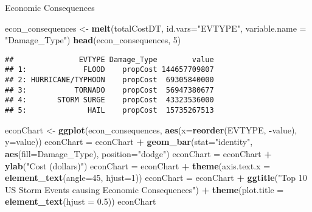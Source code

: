 \documentclass[]{article}
\newenvironment{Shaded}{\begin{snugshade}}{\end{snugshade}}
\newcommand{\DataTypeTok}[1]{\textcolor[rgb]{0.13,0.29,0.53}{#1}}
\newcommand{\DecValTok}[1]{\textcolor[rgb]{0.00,0.00,0.81}{#1}}
\newcommand{\FloatTok}[1]{\textcolor[rgb]{0.00,0.00,0.81}{#1}}
\newcommand{\KeywordTok}[1]{\textcolor[rgb]{0.13,0.29,0.53}{\textbf{#1}}}
\newcommand{\NormalTok}[1]{#1}
\newcommand{\OperatorTok}[1]{\textcolor[rgb]{0.81,0.36,0.00}{\textbf{#1}}}
\newcommand{\StringTok}[1]{\textcolor[rgb]{0.31,0.60,0.02}{#1}}
\begin{document}
Economic Consequences

\begin{Shaded}
\begin{Highlighting}[]
\NormalTok{econ_consequences <-}\StringTok{ }\KeywordTok{melt}\NormalTok{(totalCostDT, }\DataTypeTok{id.vars=}\StringTok{"EVTYPE"}\NormalTok{, }\DataTypeTok{variable.name =} \StringTok{"Damage_Type"}\NormalTok{)}
\KeywordTok{head}\NormalTok{(econ_consequences, }\DecValTok{5}\NormalTok{)}
\end{Highlighting}
\end{Shaded}

\begin{verbatim}
##               EVTYPE Damage_Type        value
## 1:             FLOOD    propCost 144657709807
## 2: HURRICANE/TYPHOON    propCost  69305840000
## 3:           TORNADO    propCost  56947380677
## 4:       STORM SURGE    propCost  43323536000
## 5:              HAIL    propCost  15735267513
\end{verbatim}

\begin{Shaded}
\begin{Highlighting}[]
\NormalTok{econChart <-}\StringTok{ }\KeywordTok{ggplot}\NormalTok{(econ_consequences, }\KeywordTok{aes}\NormalTok{(}\DataTypeTok{x=}\KeywordTok{reorder}\NormalTok{(EVTYPE, }\OperatorTok{-}\NormalTok{value), }\DataTypeTok{y=}\NormalTok{value))}
\NormalTok{econChart =}\StringTok{ }\NormalTok{econChart }\OperatorTok{+}\StringTok{ }\KeywordTok{geom_bar}\NormalTok{(}\DataTypeTok{stat=}\StringTok{"identity"}\NormalTok{, }\KeywordTok{aes}\NormalTok{(}\DataTypeTok{fill=}\NormalTok{Damage_Type), }\DataTypeTok{position=}\StringTok{"dodge"}\NormalTok{)}
\NormalTok{econChart =}\StringTok{ }\NormalTok{econChart }\OperatorTok{+}\StringTok{ }\KeywordTok{ylab}\NormalTok{(}\StringTok{"Cost (dollars)"}\NormalTok{) }
\NormalTok{econChart =}\StringTok{ }\NormalTok{econChart }\OperatorTok{+}\StringTok{ }\KeywordTok{theme}\NormalTok{(}\DataTypeTok{axis.text.x =} \KeywordTok{element_text}\NormalTok{(}\DataTypeTok{angle=}\DecValTok{45}\NormalTok{, }\DataTypeTok{hjust=}\DecValTok{1}\NormalTok{))}
\NormalTok{econChart =}\StringTok{ }\NormalTok{econChart }\OperatorTok{+}\StringTok{ }\KeywordTok{ggtitle}\NormalTok{(}\StringTok{"Top 10 US Storm Events causing Economic Consequences"}\NormalTok{) }\OperatorTok{+}\StringTok{ }\KeywordTok{theme}\NormalTok{(}\DataTypeTok{plot.title =} \KeywordTok{element_text}\NormalTok{(}\DataTypeTok{hjust =} \FloatTok{0.5}\NormalTok{))}
\NormalTok{econChart}
\end{Highlighting}
\end{Shaded}
\end{document}
